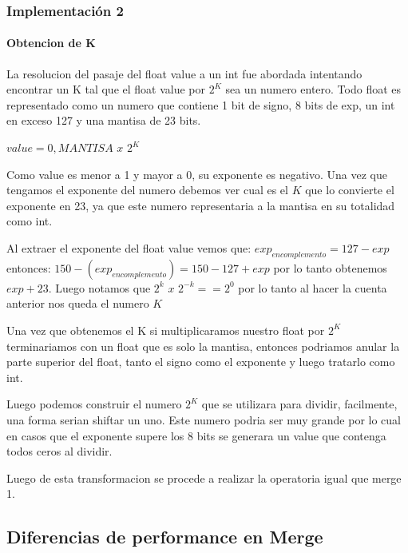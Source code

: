 \documentclass[a4paper]{article}
\begin{document}
\vspace*{0.3cm}

\subsubsection{Implementación 2}

\paragraph*{Obtencion de K}
	La resolucion del pasaje del float value a un int fue abordada intentando encontrar un K tal que el float value por $2^K$ sea un numero entero.
	Todo float es representado como un numero que contiene 1 bit de signo, 8 bits de exp, un int en exceso 127 y una mantisa de 23 bits.

	$value=0,MANTISA$ $x$ $2^K$

Como value es menor a 1 y mayor a 0, su exponente es negativo.
Una vez que tengamos el exponente del numero debemos ver cual es el $K$ que lo convierte el exponente en 23, ya que este numero representaria a la mantisa en su totalidad como int.
	
Al extraer el exponente del float value vemos que:
$exp_{encomplemento}=127-exp$
entonces:
$150-(exp_{encomplemento}) = 150-127 + exp$
por lo tanto obtenemos $exp + 23$. 
Luego notamos que $2^k$ $x$ $2^{-k} == 2^0$
por lo tanto al hacer la cuenta anterior nos queda el numero $K$

Una vez que obtenemos el K si multiplicaramos nuestro float por $2^K$ terminariamos con un float que es solo la mantisa, entonces podriamos anular la parte superior del float, tanto el signo como el exponente y luego tratarlo como int.

Luego podemos construir el numero $2^K$ que se utilizara para dividir, facilmente, una forma serian shiftar un uno. Este numero podria ser muy grande por lo cual en casos que el exponente supere los 8 bits se generara un value que contenga todos ceros al dividir.

Luego de esta transformacion se procede a realizar la operatoria igual que merge 1.

\subsection{Diferencias de performance en Merge}
\end{document}
